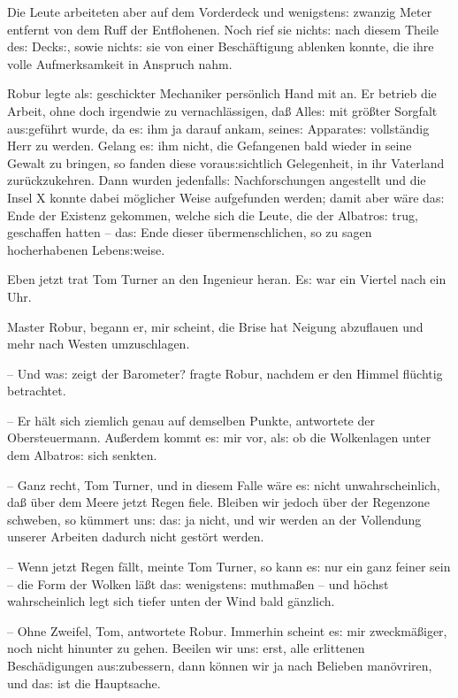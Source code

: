\documentclass[oneside,12pt]{book}
\newcommand{\s}{s:}
\begin{document}
Die Leute arbeiteten aber auf dem Vorderdeck und wenigsten{\s}
zwanzig Meter entfernt von dem Ruff der Entflohenen. Noch rief sie
nicht{\s} nach diesem Theile de{\s} Deck{\s}, sowie nicht{\s} sie von
einer Besch\"aftigung ablenken konnte, die ihre volle Aufmerksamkeit
in Anspruch nahm.

Robur legte al{\s} geschickter Mechaniker pers\"onlich Hand mit an.
Er betrieb die Arbeit, ohne doch irgendwie zu vernachl\"assigen,
da{\ss} Alle{\s} mit gr\"o{\ss}ter Sorgfalt au{\s}gef\"uhrt wurde, da
e{\s} ihm ja darauf ankam, seine{\s} Apparate{\s} vollst\"andig Herr
zu werden. Gelang e{\s} ihm nicht, die Gefangenen bald wieder in
seine Gewalt zu bringen, so fanden diese vorau{\s}sichtlich
Gelegenheit, in ihr Vaterland zur\"uckzukehren. Dann wurden
jedenfall{\s} Nachforschungen angestellt und die Insel X konnte dabei
m\"oglicher Weise aufgefunden werden; damit aber w\"are da{\s} Ende
der Existenz gekommen, welche sich die Leute, die der
{\glqq}Albatro{\s}{\grqq} trug, geschaffen hatten -- da{\s} Ende
dieser \"ubermenschlichen, so zu sagen hocherhabenen Leben{\s}weise.

Eben jetzt trat Tom Turner an den Ingenieur heran. E{\s} war ein
Viertel nach ein Uhr.

{\glqq}Master Robur, begann er, mir scheint, die Brise hat Neigung
abzuflauen und mehr nach Westen umzuschlagen.

-- Und wa{\s} zeigt der Barometer? fragte Robur, nachdem er den
Himmel fl\"uchtig betrachtet.

-- Er h\"alt sich ziemlich genau auf demselben Punkte, antwortete der
Obersteuermann. Au{\ss}erdem kommt e{\s} mir vor, al{\s} ob die
Wolkenlagen unter dem {\glqq}Albatro{\s}{\grqq} sich senkten.

-- Ganz recht, Tom Turner, und in diesem Falle w\"are e{\s} nicht
unwahrscheinlich, da{\ss} \"uber dem Meere jetzt Regen fiele. Bleiben
wir jedoch \"uber der Regenzone schweben, so k\"ummert un{\s} da{\s}
ja nicht, und wir werden an der Vollendung unserer Arbeiten dadurch
nicht gest\"ort werden.

-- Wenn jetzt Regen f\"allt, meinte Tom Turner, so kann e{\s} nur
ein ganz feiner sein -- die Form der Wolken l\"a{\ss}t da{\s}
wenigsten{\s} muthma{\ss}en -- und h\"ochst wahrscheinlich legt sich
tiefer unten der Wind bald g\"anzlich.

-- Ohne Zweifel, Tom, antwortete Robur. Immerhin scheint e{\s} mir
zweckm\"a{\ss}iger, noch nicht hinunter zu gehen. Beeilen wir un{\s}
erst, alle erlittenen Besch\"adigungen au{\s}zubessern, dann k\"onnen
wir ja nach Belieben man\"ovriren, und da{\s} ist die
Hauptsache.{\grqq}
\end{document}
